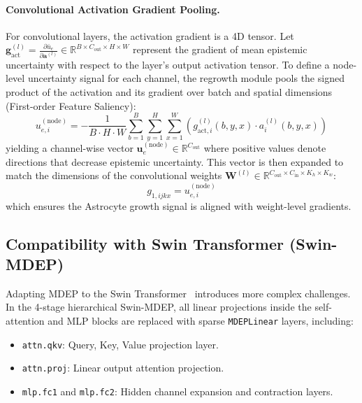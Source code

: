 \documentclass[letterpaper]{article} %
\newcommand{\R}{\mathbb{R}}
\begin{document}
\paragraph{Convolutional Activation Gradient Pooling.}
For convolutional layers, the activation gradient is a 4D tensor. Let $\bm{g}_{\text{act}}^{(l)} = \frac{\partial \bar{u}_e}{\partial \bm{a}^{(l)}} \in \R^{B \times C_{\text{out}} \times H \times W}$ represent the gradient of mean epistemic uncertainty with respect to the layer's output activation tensor. To define a node-level uncertainty signal for each channel, the regrowth module pools the signed product of the activation and its gradient over batch and spatial dimensions (First-order Feature Saliency):
\begin{equation}\label{eq:conv_pooling}
    u_{e,i}^{(\text{node})} = - \frac{1}{B \cdot H \cdot W} \sum_{b=1}^B \sum_{y=1}^H \sum_{x=1}^W \left( g_{\text{act}, i}^{(l)}(b, y, x) \cdot a_i^{(l)}(b, y, x) \right)
\end{equation}
yielding a channel-wise vector $\bm{u}_e^{(\text{node})} \in \R^{C_{\text{out}}}$ where positive values denote directions that decrease epistemic uncertainty. This vector is then expanded to match the dimensions of the convolutional weights $\bm{W}^{(l)} \in \R^{C_{\text{out}} \times C_{\text{in}} \times K_h \times K_w}$:
\begin{equation}
    g_{1, ijkx} = u_{e,i}^{(\text{node})}
\end{equation}
which ensures the Astrocyte growth signal is aligned with weight-level gradients.

\subsection{Compatibility with Swin Transformer (Swin-MDEP)}\label{subsec:swin}

Adapting MDEP to the Swin Transformer~\cite{liu2021swin, liu2022swinv2} introduces more complex challenges. In the 4-stage hierarchical Swin-MDEP, all linear projections inside the self-attention and MLP blocks are replaced with sparse \texttt{MDEPLinear} layers, including:
\begin{itemize}
    \item \texttt{attn.qkv}: Query, Key, Value projection layer.
    \item \texttt{attn.proj}: Linear output attention projection.
    \item \texttt{mlp.fc1} and \texttt{mlp.fc2}: Hidden channel expansion and contraction layers.
\end{itemize}
\end{document}
